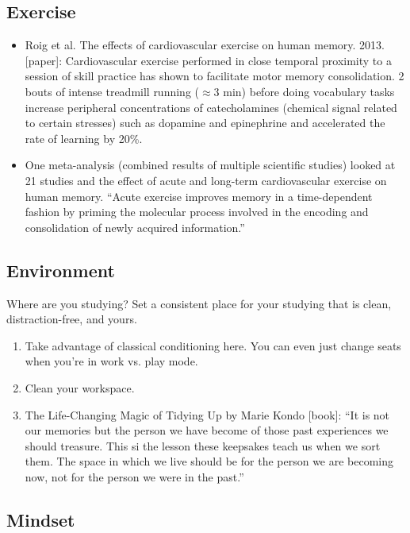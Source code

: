 \subsection{Exercise}

\begin{itemize}
	\item Roig et al. The effects of cardiovascular exercise on human memory. 2013. [paper]: Cardiovascular exercise performed in close temporal proximity to a session of skill practice has shown to facilitate motor memory consolidation. 2 bouts of intense treadmill running ($\approx 3$ min) before doing vocabulary tasks increase peripheral concentrations of catecholamines (chemical signal related to certain stresses) such as dopamine and epinephrine and accelerated the rate of learning by 20\%. 
	\item  One meta-analysis (combined results of multiple scientific studies) looked at 21 studies and the effect of acute and long-term cardiovascular exercise on human memory. ``Acute exercise improves memory in a time-dependent fashion by priming the molecular process involved in the encoding and consolidation of newly acquired information.''
\end{itemize}

\subsection{Environment}

Where are you studying? Set a consistent place for your studying that is clean, distraction-free, and yours. 

\begin{enumerate}
	\item Take advantage of classical conditioning here. You can even just change seats when you're in work vs. play mode. 
	\item Clean your workspace. 
	\item The Life-Changing Magic of Tidying Up by Marie Kondo [book]: ``It is not our memories but the person we have become of those past experiences we should treasure. This si the lesson these keepsakes teach us when we sort them. The space in which we live should be for the person we are becoming now, not for the person we were in the past.''
\end{enumerate}

\subsection{Mindset}

